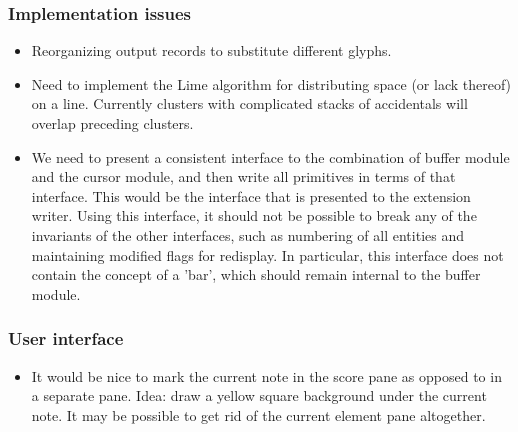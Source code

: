 \subsubsection{Implementation issues}

\begin{itemize}
\item Reorganizing output records to substitute different glyphs. 
\item Need to implement the Lime algorithm for distributing space (or
  lack thereof) on a line.  Currently clusters with complicated stacks
  of accidentals will overlap preceding clusters. 
\item We need to present a consistent interface to the combination of 
  buffer module and the cursor module, and then write all primitives
  in terms of that interface.  This would be the interface that is
  presented to the extension writer.  Using this interface, it should
  not be possible to break any of the invariants of the other
  interfaces, such as numbering of all entities and maintaining
  modified flags for redisplay.  In particular, this interface does
  not contain the concept of a 'bar', which should remain internal to
  the buffer module.  
\end{itemize}

\subsubsection{User interface}

\begin{itemize}
\item It would be nice to mark the current note in the score pane as
  opposed to in a separate pane.  Idea: draw a yellow square
  background under the current note.  It may be possible to get rid of
  the current element pane altogether. 
\end{itemize}

